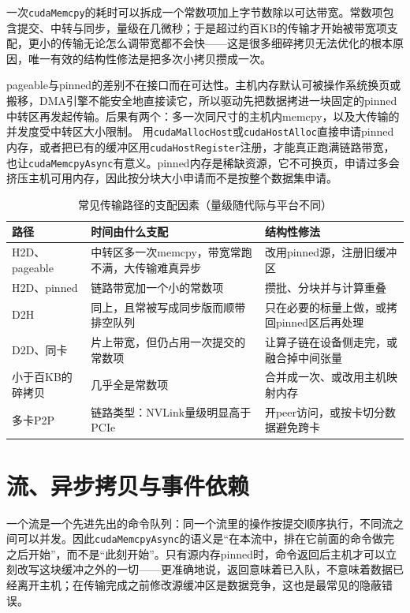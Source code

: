 \documentclass[12pt,a4paper,fontset=fandol]{ctexbook}
\newcommand{\Tp}[1]{\texttt{#1}}
\begin{document}
一次\Tp{cudaMemcpy}的耗时可以拆成一个常数项加上字节数除以可达带宽。常数项包含提交、中转与同步，量级在几微秒；于是超过约百KB的传输才开始被带宽项支配，更小的传输无论怎么调带宽都不会快——这是很多细碎拷贝无法优化的根本原因，唯一有效的结构性修法是把多次小拷贝攒成一次。

pageable与pinned的差别不在接口而在可达性。主机内存默认可被操作系统换页或搬移，DMA引擎不能安全地直接读它，所以驱动先把数据拷进一块固定的pinned中转区再发起传输。后果有两个：多一次同尺寸的主机内memcpy，以及大传输的并发度受中转区大小限制。
用\Tp{cudaMallocHost}或\Tp{cudaHostAlloc}直接申请pinned内存，或者把已有的缓冲区用\Tp{cudaHostRegister}注册，才能真正跑满链路带宽，也让\Tp{cudaMemcpyAsync}有意义。pinned内存是稀缺资源，它不可换页，申请过多会挤压主机可用内存，因此按分块大小申请而不是按整个数据集申请。

\begin{table}[H]
\centering
\caption{常见传输路径的支配因素（量级随代际与平台不同）}
\begin{tabular}{@{}>{\raggedright\arraybackslash}p{}
  >{\raggedright\arraybackslash}p{}
  >{\raggedright\arraybackslash}p{}@{}}
\toprule
路径 & 时间由什么支配 & 结构性修法 \\
\midrule
H2D、pageable & 中转区多一次memcpy，带宽常跑不满，大传输难真异步 & 改用pinned源，注册旧缓冲区 \\
H2D、pinned & 链路带宽加一个小的常数项 & 攒批、分块并与计算重叠 \\
D2H & 同上，且常被写成同步版而顺带排空队列 & 只在必要的标量上做，或拷回pinned区后再处理 \\
D2D、同卡 & 片上带宽，但仍占用一次提交的常数项 & 让算子链在设备侧走完，或融合掉中间张量 \\
小于百KB的碎拷贝 & 几乎全是常数项 & 合并成一次、或改用主机映射内存 \\
多卡P2P & 链路类型：NVLink量级明显高于PCIe & 开peer访问，或按卡切分数据避免跨卡 \\
\bottomrule
\end{tabular}
\end{table}

\section{流、异步拷贝与事件依赖}

一个流是一个先进先出的命令队列：同一个流里的操作按提交顺序执行，不同流之间可以并发。因此\Tp{cudaMemcpyAsync}的语义是``在本流中，排在它前面的命令做完之后开始''，而不是``此刻开始''。只有源内存pinned时，命令返回后主机才可以立刻改写这块缓冲之外的一切——更准确地说，返回意味着已入队，不意味着数据已经离开主机；在传输完成之前修改源缓冲区是数据竞争，这也是最常见的隐蔽错误。
\end{document}
